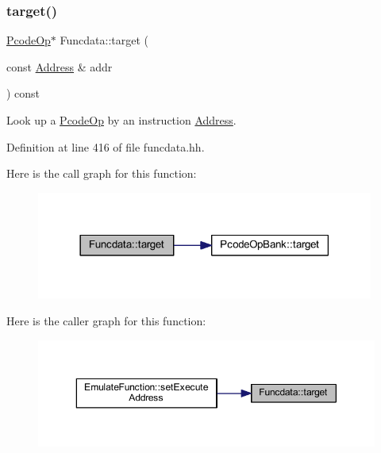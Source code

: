 \subsubsection{\texorpdfstring{target()}{target()}}
{\footnotesize\ttfamily \mbox{\hyperlink{class_pcode_op}{Pcode\+Op}}$\ast$ Funcdata\+::target (\begin{DoxyParamCaption}\item[{const \mbox{\hyperlink{class_address}{Address}} \&}]{addr }\end{DoxyParamCaption}) const\hspace{0.3cm}{\ttfamily [inline]}}



Look up a \mbox{\hyperlink{class_pcode_op}{Pcode\+Op}} by an instruction \mbox{\hyperlink{class_address}{Address}}. 



Definition at line 416 of file funcdata.\+hh.

Here is the call graph for this function\+:
\nopagebreak
\begin{figure}[H]
\begin{center}
\leavevmode
\includegraphics[width=314pt]{class_funcdata_ae15b1cdeaad3e020a732fc31015f4547_cgraph}
\end{center}
\end{figure}
Here is the caller graph for this function\+:
\nopagebreak
\begin{figure}[H]
\begin{center}
\leavevmode
\includegraphics[width=350pt]{class_funcdata_ae15b1cdeaad3e020a732fc31015f4547_icgraph}
\end{center}
\end{figure}
\mbox{\label{class_funcdata_aab7f940f85609d395283520eca3a71f0}} 
